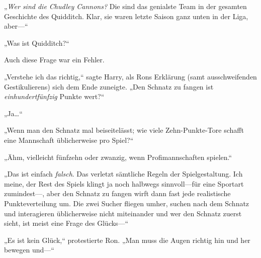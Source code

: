 „\emph{Wer sind die Chudley Cannons?} Die sind das genialste Team in der gesamten Geschichte des Quidditch. Klar, sie waren letzte Saison ganz unten in der Liga, aber—“

„Was ist Quidditch?“

Auch diese Frage war ein Fehler.

„Verstehe ich das richtig,“ sagte Harry, als Rons Erklärung (samt ausschweifenden Gestikulierens) sich dem Ende zuneigte. „Den Schnatz zu fangen ist \emph{einhundertfünfzig} Punkte wert?“

„Ja…“

„Wenn man den Schnatz mal beiseitelässt; wie viele Zehn-Punkte-Tore schafft eine Mannschaft üblicherweise pro Spiel?“

„Ähm, vielleicht fünfzehn oder zwanzig, wenn Profimannschaften spielen.“

„Das ist einfach \emph{falsch}. Das verletzt sämtliche Regeln der Spielgestaltung. Ich meine, der Rest des Spiels klingt ja noch halbwegs sinnvoll—für eine Sportart zumindest—, aber den Schnatz zu fangen wirft dann fast jede realistische Punkteverteilung um. Die zwei Sucher fliegen umher, suchen nach dem Schnatz und interagieren üblicherweise nicht miteinander und wer den Schnatz zuerst sieht, ist meist eine Frage des Glücks—“

„Es ist kein Glück,“ protestierte Ron. „Man muss die Augen richtig hin und her bewegen und—“

